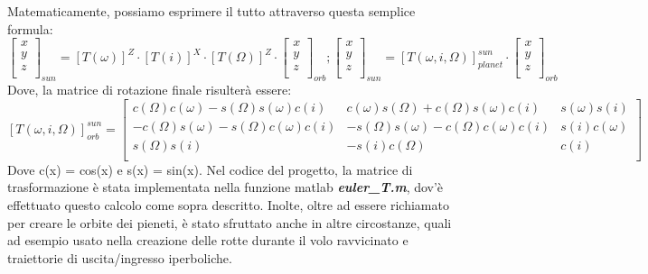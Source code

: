 \documentclass[a4paper]{article}
\begin{document}
Matematicamente, possiamo esprimere il tutto attraverso questa semplice formula: \newline
\[
\begin{bmatrix}
x \\
y \\
z \\
\end{bmatrix}_{sun} = {[T(\omega)]}^{Z} \cdot {[T(\textit{i})]}^{X} \cdot {[T(\Omega)]}^{Z} \cdot
\begin{bmatrix}
x  \\
y \\
z \\
\end{bmatrix}_{orb}
{;}
\begin{bmatrix}
x \\
y \\
z \\
\end{bmatrix}_{sun} = {[T(\omega,\textit{i},\Omega)]}_{planet}^{sun} \cdot
\begin{bmatrix}
x  \\
y \\
z \\
\end{bmatrix}_{orb}
\]\newline
Dove, la matrice di rotazione finale risulterà essere:\newline
\[
{[T(\omega,\textit{i},\Omega)]}_{orb}^{sun} = 
\begin{bmatrix}
c(\Omega)c(\omega)-s(\Omega)s(\omega)c(\textit{i}) & c(\omega)s(\Omega)+c(\Omega)s(\omega)c(\textit{i}) & s(\omega)s(\textit{i}) \\
-c(\Omega)s(\omega)-s(\Omega)c(\omega)c(\textit{i}) & -s(\Omega)s(\omega)-c(\Omega)c(\omega)c(\textit{i}) & s(\textit{i})c(\omega) \\
s(\Omega)s(\textit{i}) & -s(\textit{i})c(\Omega) & c(\textit{i}) \\
\end{bmatrix}
\]\newline
Dove c(x) = cos(x) e s(x) = sin(x).\newline
Nel codice del progetto, la matrice di trasformazione è stata implementata nella funzione matlab \textit{\textbf{euler\_T.m}}, dov'è effettuato questo calcolo come sopra descritto. Inolte, oltre ad essere richiamato per creare le orbite dei pieneti, è stato sfruttato anche in altre circostanze, quali ad esempio usato nella creazione delle rotte durante il volo ravvicinato e traiettorie di uscita/ingresso iperboliche.
\end{document}
